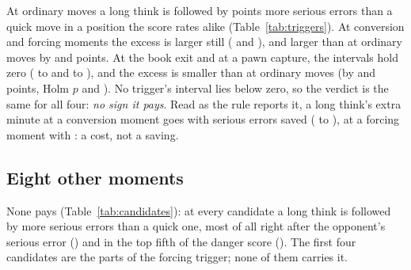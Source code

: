 \documentclass[11pt]{article}
\begin{document}
\begin{table}[h]
\centering
\small\setlength{\tabcolsep}{4pt}\TriggerTable
\caption{The four triggers and ordinary moves (none), players rated \WindowLo--\WindowHi.
Per game: moves per player per game among those analysed. Quick: under \Rushed{} seconds; long:
\Deep{} seconds or more. Error rates are raw; $\Delta$ is long minus quick within danger strata,
in percentage points, with its 95\% interval.}
\label{tab:triggers}
\end{table}

At ordinary moves a long think is followed by \NoneDelta{} points more serious errors than a quick
move in a position the score rates alike (Table~\ref{tab:triggers}). At conversion and forcing
moments the excess is larger still (\ConversionDelta{} and \ForcingDelta), and larger than at
ordinary moves by \ConversionVsNone{} and \ForcingVsNone{} points. At the book exit and at a pawn
capture, the intervals hold zero (\BookEndLo{} to \BookEndHi{} and \StructureLo{} to
\StructureHi), and the excess is smaller than at ordinary moves (by \BookEndVsNone{} and
\StructureVsNone{} points, Holm $p$ \BookEndPHolm{} and \StructurePHolm). No trigger's interval
lies below zero, so the verdict is the same for all four: \emph{no sign it pays}. Read as the rule
reports it, a long think's extra minute at a conversion moment goes with \ConversionSaved{}
serious errors saved (\ConversionSavedLo{} to \ConversionSavedHi), at a forcing moment with
\ForcingSaved{}: a cost, not a saving.

\subsection{Eight other moments}

\begin{table}[h]
\centering
\footnotesize\setlength{\tabcolsep}{4pt}\CandidateTable
\caption{The candidates, each defined by what the player sees before moving. Joins: pays, and
beats ordinary moves with a Holm-adjusted $p$ under 0.05 over the eight.}
\label{tab:candidates}
\end{table}

None pays (Table~\ref{tab:candidates}): at every candidate a long think is followed by more serious
errors than a quick one, most of all right after the opponent's serious error
(\CandAfterOppErrorDelta) and in the top fifth of the danger score (\CandHighDangerDelta). The
first four candidates are the parts of the forcing trigger; none of them carries it.
\end{document}
